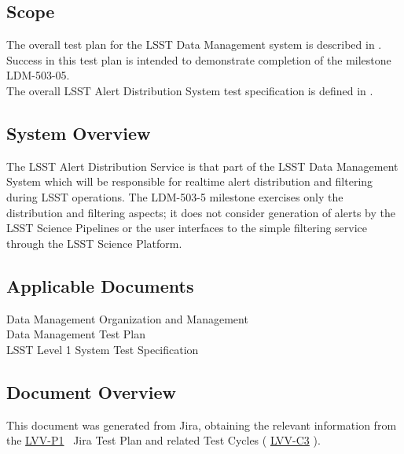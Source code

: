 \documentclass[DM,lsstdraft,STR,toc]{lsstdoc}
\begin{document}
\subsection{Scope}\label{scope}

The overall test plan for the LSST Data Management system is described
in .\\
Success in this test plan is intended to demonstrate completion of the
milestone LDM-503-05.\\
The overall LSST Alert Distribution System test specification is defined
in .



\subsection{System Overview}
\label{sect:systemoverview}

The LSST Alert Distribution Service is that part of the LSST Data
Management System which will be responsible for realtime alert
distribution and filtering during LSST operations. The LDM-503-5
milestone exercises only the distribution and filtering aspects; it does
not consider generation of alerts by the LSST Science Pipelines or the
user interfaces to the simple filtering service through the LSST Science
Platform.\\[2\baselineskip]

\subsection{Applicable Documents}\label{applicable-documents}

 Data Management Organization and Management\\
 Data Management Test Plan\\
 LSST Level 1 System Test Specification


\subsection{Document Overview}
\label{sect:docoverview}

This document was generated from Jira, obtaining the relevant information from the 
\href{https://jira.lsstcorp.org/secure/Tests.jspa#/testPlan/LVV-P1}{LVV-P1}
~Jira Test Plan and related Test Cycles (
  \href{https://jira.lsstcorp.org/secure/Tests.jspa#/testCycle/LVV-C3}{LVV-C3}
).

\end{document}
